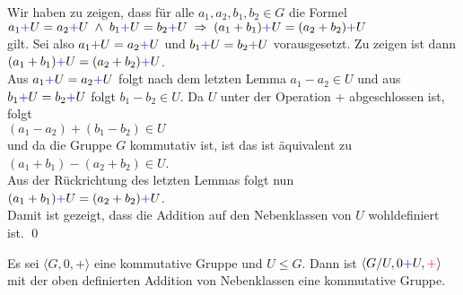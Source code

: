 \proof
Wir haben zu zeigen, dass f\"{u}r alle $a_1,a_2,b_1,b_2 \in G$ die Formel
\\[0.2cm]
\hspace*{1.3cm}
$a_1 {\color{blue}{+}} U = a_2 {\color{blue}{+}} U \;\wedge\; b_1 {\color{blue}{+}} U = b_2 {\color{blue}{+}} U \;\Rightarrow\; (a_1 + b_1) {\color{blue}{+}} U = (a_2 + b_2) {\color{blue}{+}} U$
\\[0.2cm]
gilt.  Sei also $a_1 {\color{blue}{+}} U = a_2 {\color{blue}{+}} U$ und $b_1 {\color{blue}{+}} U = b_2 {\color{blue}{+}} U$ vorausgesetzt.  
Zu zeigen ist dann
\\[0.2cm]
\hspace*{1.3cm}
$(a_1 + b_1) {\color{blue}{+}} U = (a_2 + b_2) {\color{blue}{+}} U$.
\\[0.2cm]
Aus $a_1 {\color{blue}{+}} U = a_2 {\color{blue}{+}} U$ folgt nach dem letzten Lemma $a_1 - a_2 \in U$  und aus
$b_1 {\color{blue}{+}} U = b_2 {\color{blue}{+}} U$ folgt $b_1 - b_2 \in U$.  Da $U$ unter der Operation $+$ abgeschlossen ist, folgt
\\[0.2cm]
\hspace*{1.3cm}
$(a_1 - a_2) + (b_1 - b_2) \in U$
\\[0.2cm]
und da die Gruppe $G$ kommutativ ist, ist das ist \"{a}quivalent zu
\\[0.2cm]
\hspace*{1.3cm}
$(a_1 + b_1) - (a_2 + b_2) \in U$.
\\[0.2cm]
Aus der R\"{u}ckrichtung des letzten  Lemmas folgt nun
\\[0.2cm]
\hspace*{1.3cm}
$(a_1 + b_1) {\color{blue}{+}}  U = (a_2 + b_2) {\color{blue}{+}} U$.
\\[0.2cm]
Damit ist gezeigt, dass die Addition auf den Nebenklassen von $U$ wohldefiniert ist. 
\qed

\begin{Satz}
 Es sei $\langle G, 0, + \rangle$ eine kommutative Gruppe und $U \leq G$.
 Dann ist $\langle G/U, 0 {\color{blue}{+}} U, {\color{red}{+}} \rangle$ mit der oben definierten Addition von Nebenklassen eine kommutative Gruppe.
\end{Satz}

